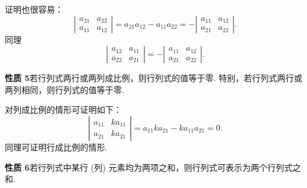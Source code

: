 \documentclass[UTF8, 12pt, fontset=fandol, oneside]{ctexart}
\begin{document}
证明也很容易：
\[
\left|\begin{array}{cc}
a_{21} & a_{22}\\
a_{11} & a_{12}
\end{array}\right|
=a_{21}a_{12}-a_{11}a_{22}
=-\left|\begin{array}{cc}
a_{11} & a_{12}\\
a_{21} & a_{22}
\end{array}\right|.
\]
同理
\[
\left|\begin{array}{cc}
a_{12} & a_{11}\\
a_{22} & a_{21}
\end{array}\right|
=-\left|\begin{array}{cc}
a_{11} & a_{12}\\
a_{21} & a_{22}
\end{array}\right|.
\]

\noindent\textbf{性质 5}\quad 若行列式两行或两列成比例，则行列式的值等于零. 特别，若行列式两行或两列相同，则行列式的值等于零.

对列成比例的情形可证明如下：
\[
\left|\begin{array}{cc}
a_{11} & ka_{11}\\
a_{21} & ka_{21}
\end{array}\right|
=a_{11}ka_{21}-ka_{11}a_{21}=0.
\]
同理可证明行成比例的情形.

\noindent\textbf{性质 6}\quad 若行列式中某行 (列) 元素均为两项之和，则行列式可表示为两个行列式之和.
\end{document}
